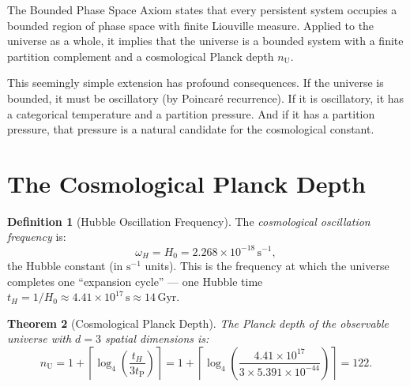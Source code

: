 \documentclass[twocolumn,10pt,a4paper]{article}
\theoremstyle{thmstyle}
\newtheorem{theorem}{Theorem}[section]
\theoremstyle{definition}
\newtheorem{definition}[theorem]{Definition}
\theoremstyle{remark}
\newcommand{\nU}{n_{\mathrm{U}}}
\newcommand{\tP}{t_{\mathrm{P}}}
\begin{document}
The Bounded Phase Space Axiom states that every persistent system occupies
a bounded region of phase space with finite Liouville measure. Applied to
the universe as a whole, it implies that the universe is a bounded system
with a finite partition complement and a cosmological Planck depth $\nU$.

This seemingly simple extension has profound consequences. If the universe
is bounded, it must be oscillatory (by Poincar\'e recurrence). If it is
oscillatory, it has a categorical temperature and a partition pressure.
And if it has a partition pressure, that pressure is a natural candidate
for the cosmological constant.

\section{The Cosmological Planck Depth}
\label{sec:cosm_depth}

\begin{definition}[Hubble Oscillation Frequency]
\label{def:hubble_freq}
The \emph{cosmological oscillation frequency} is:
\begin{equation}
\omega_H = H_0 = 2.268\times10^{-18}\,\mathrm{s}^{-1},
\label{eq:omega_H}
\end{equation}
the Hubble constant (in $\mathrm{s}^{-1}$ units). This is the frequency
at which the universe completes one ``expansion cycle'' --- one Hubble time
$t_H = 1/H_0 \approx 4.41\times10^{17}\,\mathrm{s} \approx 14\,\mathrm{Gyr}$.
\end{definition}

\begin{theorem}[Cosmological Planck Depth]
\label{thm:cosmological_depth}
The Planck depth of the observable universe with $d = 3$ spatial
dimensions is:
\begin{equation}
\nU = 1 + \left\lceil\log_4\!\left(\frac{t_H}{3\tP}\right)\right\rceil
= 1 + \left\lceil\log_4\!\left(\frac{4.41\times10^{17}}{3\times5.391\times10^{-44}}\right)\right\rceil
= 122.
\label{eq:nU}
\end{equation}
\end{theorem}
\end{document}
